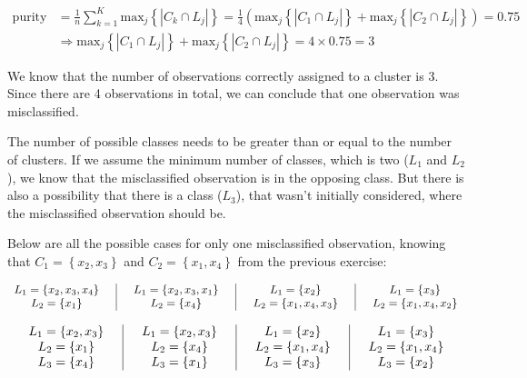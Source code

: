 \documentclass[12pt]{article}
\begin{document}
\begin{enumerate}[leftmargin=\labelsep]
        \vskip -0.5cm
        \begin{align*}
          \text{purity} & = \frac{1}{n} \sum_{k=1}^K \text{max}_j\left\{\left|C_k \cap L_j\right|\right\}
          = \frac{1}{4} \left(\text{max}_j\left\{\left|C_1 \cap L_j\right|\right\} + \text{max}_j\left\{\left|C_2 \cap L_j\right|\right\}\right) = 0.75               \\
                        & \Rightarrow \text{max}_j\left\{\left|C_1 \cap L_j\right|\right\} + \text{max}_j\left\{\left|C_2 \cap L_j\right|\right\} = 4 \times 0.75 = 3
        \end{align*}

        We know that the number of observations correctly assigned to a cluster is 3. Since there are 4 observations in total, we can conclude that one observation was
        misclassified.

        The number of possible classes needs to be greater than or equal to the number of clusters. If we assume the minimum number of classes, which is two ($L_1$ and $L_2$),
        we know that the misclassified observation is in the opposing class. But there is also a possibility that there is a class ($L_3$), that wasn't initially considered,
        where the misclassified observation should be.

        Below are all the possible cases for only one misclassified observation, knowing that $C_1 = \left\{x_2, x_3\right\}$ and $C_2 = \left\{x_1, x_4\right\}$ from the previous exercise:

        \begin{equation}\label{exI4-purity-cases-1}
          \begin{array}{c|c|c|c}
            \centering
            L_1 = \left\{x_2, x_3, x_4\right\} \quad & \quad L_1 = \left\{x_2, x_3, x_1\right\} \quad & \quad L_1 = \left\{x_2\right\} \quad           & \quad L_1 = \left\{x_3\right\}           \\
            L_2 = \left\{x_1\right\} \quad           & \quad L_2 = \left\{x_4\right\} \quad           & \quad L_2 = \left\{x_1, x_4, x_3\right\} \quad & \quad L_2 = \left\{x_1, x_4, x_2\right\}
          \end{array}
        \end{equation}

        \begin{equation}\label{exI4-purity-cases-2}
          \begin{array}{c|c|c|c}
            \centering
            L_1 = \left\{x_2, x_3\right\} \quad & \quad L_1 = \left\{x_2, x_3\right\} \quad & \quad L_1 = \left\{x_2\right\} \quad      & \quad L_1 = \left\{x_3\right\}      \\
            L_2 = \left\{x_1\right\} \quad      & \quad L_2 = \left\{x_4\right\} \quad      & \quad L_2 = \left\{x_1, x_4\right\} \quad & \quad L_2 = \left\{x_1, x_4\right\} \\
            L_3 = \left\{x_4\right\} \quad      & \quad L_3 = \left\{x_1\right\} \quad      & \quad L_3 = \left\{x_3\right\} \quad      & \quad L_3 = \left\{x_2\right\}
          \end{array}
        \end{equation}


\end{enumerate}
\end{document}
